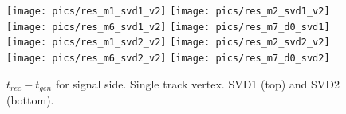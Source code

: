 \documentclass[preprint,aps,showpacs]{revtex4}
\begin{document}

\begin{figure}[htb]
\texttt{[image: pics/res\_m1\_svd1\_v2]}
\texttt{[image: pics/res\_m2\_svd1\_v2]}
\texttt{[image: pics/res\_m6\_svd1\_v2]}
\texttt{[image: pics/res\_m7\_d0\_svd1]}\\
\texttt{[image: pics/res\_m1\_svd2\_v2]}
\texttt{[image: pics/res\_m2\_svd2\_v2]}
\texttt{[image: pics/res\_m6\_svd2\_v2]}
\texttt{[image: pics/res\_m7\_d0\_svd2]}\\
\caption{$t_{rec}-t_{gen}$ for signal side. Single track vertex. SVD1 (top) and SVD2 (bottom).}
\label{fig:R_det_sig_sgl}
\end{figure}
\end{document}
